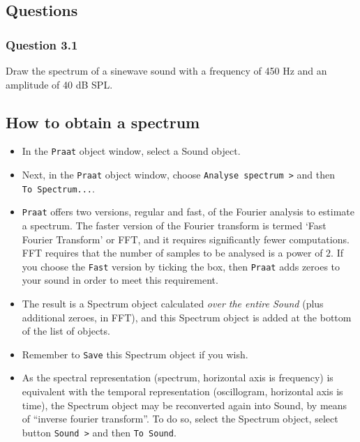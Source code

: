 \documentclass[
]{book}
\begin{document}
\label{questions-spectrum}
\subsection*{Questions}\label{questions-2}

\subsubsection*{Question 3.1}\label{question-3.1}

Draw the spectrum of a sinewave sound with a frequency of 450 Hz and an amplitude of 40 dB SPL.

\label{box:praatspectrum}
\subsection{How to obtain a spectrum}\label{how-to-obtain-a-spectrum}

\begin{itemize}
\item
  In the \texttt{Praat} object window, select a Sound object.
\item
  Next, in the \texttt{Praat} object window, choose \texttt{Analyse\ spectrum\ \textgreater{}} and then \texttt{To\ Spectrum...}.
\item
  \texttt{Praat} offers two versions, regular and fast, of the Fourier analysis to estimate a spectrum. The faster version of the Fourier transform is termed `Fast Fourier Transform' or FFT, and it requires significantly fewer computations. FFT requires that the number of samples to be analysed is a power of \(2\). If you choose the \texttt{Fast} version by ticking the box, then \texttt{Praat} adds zeroes to your sound in order to meet this requirement.
\item
  The result is a Spectrum object calculated \emph{over the entire Sound} (plus additional zeroes, in FFT), and this Spectrum object is added at the bottom of the list of objects.
\item
  Remember to \texttt{Save} this Spectrum object if you wish.
\item
  As the spectral representation (spectrum, horizontal axis is frequency) is equivalent with the temporal representation (oscillogram, horizontal axis is time), the Spectrum object may be reconverted again into Sound, by means of ``inverse fourier transform''.
  To do so, select the Spectrum object, select button \texttt{Sound\ \textgreater{}} and then \texttt{To\ Sound}.
\end{itemize}
\end{document}
